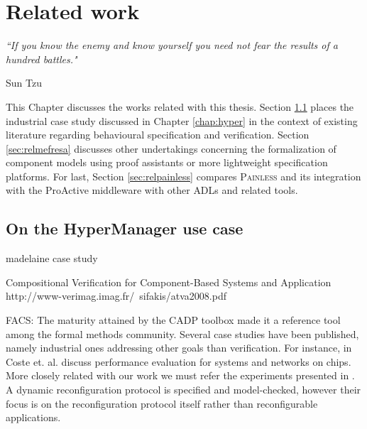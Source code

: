 
\chapter{Related work} 
\label{chap:related} 


\epigraph{\textit{“If you know the enemy and know yourself you need 
                             not fear the results of a hundred battles."}}{Sun Tzu}

\minitoc



		This Chapter discusses the works related with this thesis. Section \ref{sec:relhyper} places the industrial
	case study discussed in Chapter \ref{chap:hyper} in the context of existing literature regarding behavioural
	specification and verification. Section \ref{sec:relmefresa} discusses other undertakings concerning the formalization
	of component models using proof assistants or more lightweight specification platforms. For last, 
	Section \ref{sec:relpainless} compares \textsc{Painless} and its integration with the ProActive middleware
	with other \ac{ADL}s and related tools.
	

\section{On the HyperManager use case}
\label{sec:relhyper}


	\cite{BHHM:FACS11} madelaine case study
	
	
	Compositional Verification for Component-Based Systems and Application
	http://www-verimag.imag.fr/~sifakis/atva2008.pdf
	\cite{BBN+10} 


	FACS:
	  The maturity attained by the CADP toolbox 
		made it a reference tool among the formal methods community.  Several case studies have been published, 
		namely industrial ones addressing other goals than verification. For instance, in \cite{conf/cav/CosteHLS09}
	Coste et. al. discuss performance evaluation for systems and networks on chips.			
	 More closely related with our work we must refer the experiments presented in 
	 \cite{conf/dais/CornejoGMP01}. A dynamic reconfiguration protocol is specified and model-checked,
	 however their focus is on the reconfiguration protocol itself rather than reconfigurable applications.
		 
